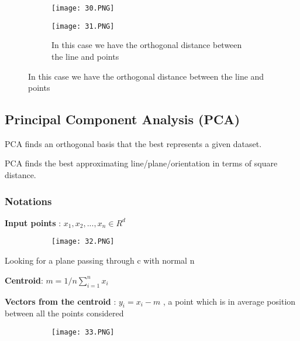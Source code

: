 \documentclass{article}
\begin{document}
\begin{figure}[ht!]
  \centering
  \begin{subfigure}[b]{0.5\linewidth}
    \texttt{[image: 30.PNG]}
  \end{subfigure}
     \begin{subfigure}[b]{0.49\textwidth}
         \centering
         \texttt{[image: 31.PNG]}
         \caption{In this case we have the orthogonal distance between the line and points}
     \end{subfigure}
\end{figure}

\subsection{Principal Component Analysis (PCA)}

PCA finds an orthogonal basis that the best represents a given dataset.

PCA finds the best approximating line/plane/orientation in terms of square distance.

\vspace{20mm}

\subsubsection{Notations}

\textbf{Input points} : $x_1,x_2,...,x_n \in R^d$

\begin{figure}[ht!]
  \centering
  \begin{subfigure}[b]{0.3\linewidth}
    \texttt{[image: 32.PNG]}
  \end{subfigure}
\end{figure}

Looking for a plane passing through c with normal n

\textbf{Centroid}: $m = 1/n \sum_{i=1}^n x_i$

\textbf{Vectors from the centroid} : $y_i = x_i - m$ , a point which is in average position between all the points considered



\begin{figure}[ht!]
  \centering
  \begin{subfigure}[b]{0.8\linewidth}
    \texttt{[image: 33.PNG]}
  \end{subfigure}
\end{figure}
\end{document}
